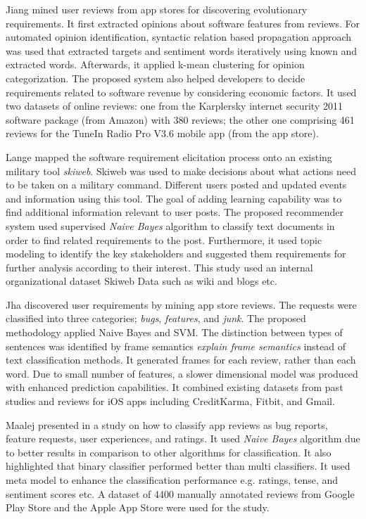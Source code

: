 	Jiang \etal \cite{Jiang:2014} mined user reviews from 
app stores for discovering evolutionary requirements. It first extracted opinions about software features from reviews. For automated opinion identification, syntactic
relation based propagation approach was used that extracted targets and sentiment words
iteratively using known and extracted words. Afterwards, it applied k-mean clustering for opinion categorization.
 The proposed system also helped developers to decide requirements related to software revenue by considering economic factors.  It used two datasets of online reviews: one from the
Karplersky internet security 2011 software package (from Amazon) with 380
reviews; the other one comprising 461 reviews for the  TuneIn Radio Pro V3.6
mobile app (from the app store).

	Lange \etal\cite{Douglas:S2008} mapped the software requirement elicitation
process onto an existing military tool \emph{skiweb}. Skiweb was used to make decisions about what actions need to be taken on a military command. Different users posted and updated events and information using this tool. The goal of adding learning capability was to find additional information relevant to user posts. The proposed recommender system used supervised
\emph{Naive Bayes} algorithm to classify text documents in order to find related
requirements to the post. Furthermore, it
 used topic modeling to identify the key
stakeholders and suggested them requirements for further analysis according to their interest. This study used an internal organizational
dataset Skiweb Data such as wiki and blogs etc.

	Jha \etal \cite{Jha:2017} discovered user requirements by mining app store reviews. The requests were classified into three categories;
\emph{bugs}, \emph{features}, and \emph{junk}. The proposed methodology applied Naive Bayes and SVM. The distinction between types of sentences was identified by frame semantics \emph{explain frame semantics} instead of text classification methods. It generated frames for each review, rather than each word. Due to small number of features, a slower dimensional model was produced with enhanced prediction capabilities. It combined existing
datasets from past studies and reviews for iOS apps including CreditKarma,
Fitbit, and Gmail.

	Maalej presented in \cite{Maalej} a study on how to classify app reviews as bug
reports, feature requests, user experiences, and ratings. It used
\emph{Naive Bayes} algorithm due to better results in comparison to other algorithms for classification. It also highlighted that binary
classifier performed better than multi
classifiers. It used meta model to enhance the classification performance e.g. ratings,
tense, and sentiment scores etc. A
dataset of 4400 manually annotated reviews from Google Play Store and the Apple App
Store were used for the study.

